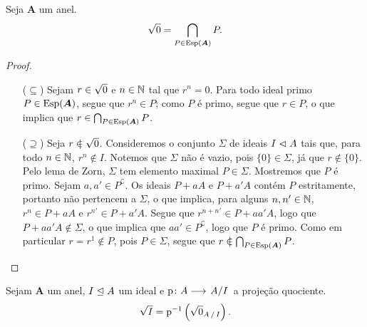 \begin{proposition}
Seja $\bm A$ um anel.
	\begin{equation*}
	\sqrt{0} = \bigcap_{P \in \operatorname{Esp}(\bm A)} P.
	\end{equation*}
\end{proposition}
\begin{proof}
	\begin{itemize}
	\item [($\subseteq$)] Sejam $r \in \sqrt{0}$ e $n \in \mathbb{N}$ tal que $r^n=0$. Para todo ideal primo $P \in \operatorname{Esp}(\bm A)$, segue que $r^n \in P$; como $P$ é primo, segue que $r \in P$, o que implica que $r \in \bigcap_{P \in \operatorname{Esp}(\bm A)} P$.

	\item [($\supseteq$)] Seja $r \notin \rad{0}$. Consideremos o conjunto $\Sigma$ de ideais $I \mathrel{\lhd} A$ tais que, para todo $n \in \mathbb{N}$, $r^n \notin I$. Notemos que $\Sigma$ não é vazio, pois $\{0\} \in \Sigma$, já que $r \notin \{0\}$. Pelo lema de Zorn, $\Sigma$ tem elemento maximal $P \in \Sigma$. Mostremos que $P$ é primo. Sejam $a,a' \in P^ \complement$. Os ideais $P+aA$ e $P+a'A$ contém $P$ estritamente, portanto não pertencem a $\Sigma$, o que implica, para alguns $n,n' \in \mathbb{N}$, $r^n \in P+aA$ e $r^{n'} \in P+a'A$. Segue que $r^{n+n'} \in P + aa'A$, logo que $P+aa'A \notin \Sigma$, o que implica que $aa' \in P^\complement$, logo que $P$ é primo. Como em particular $r =r^1\notin P$, pois $P \in \Sigma$, segue que $r \notin \bigcap_{P \in \Esp(\bm A)} P$.
	\end{itemize}
\end{proof}

\begin{exercise}
Sejam $\bm A$ um anel, $I \mathrel{\unlhd} A$ um ideal e $\fun{\proj}{A}{\quo{A}{I}}$ a projeção quociente.
	\begin{equation*}
	\rad{I} = \proj\inv \left( \rad{0}_{\quo{A}{I}} \right).
	\end{equation*}
\end{exercise}


